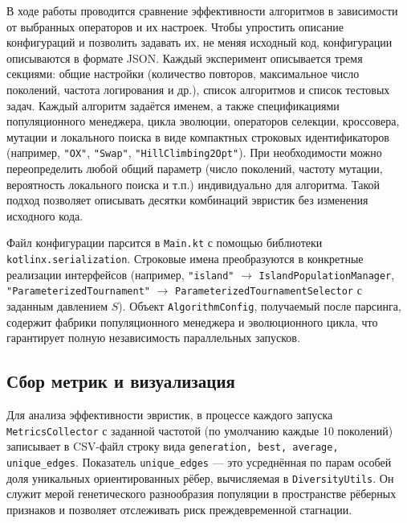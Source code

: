 \documentclass[a4paper,12pt]{article}
\begin{document}
В ходе работы проводится сравнение эффективности алгоритмов в зависимости от выбранных операторов и их настроек. Чтобы упростить описание конфигураций и позволить задавать их, не меняя исходный код, конфигурации описываются в формате JSON. Каждый эксперимент описывается тремя секциями: общие настройки (количество повторов, максимальное число поколений, частота логирования и др.), список алгоритмов и список тестовых задач. Каждый алгоритм задаётся именем, а также спецификациями популяционного менеджера, цикла эволюции, операторов селекции, кроссовера, мутации и локального поиска в виде компактных строковых идентификаторов (например, \texttt{"OX"}, \texttt{"Swap"}, \texttt{"HillClimbing2Opt"}). При необходимости можно переопределить любой общий параметр (число поколений, частоту мутации, вероятность локального поиска и т.п.) индивидуально для алгоритма. Такой подход позволяет описывать десятки комбинаций эвристик без изменения исходного кода.

Файл конфигурации парсится в \texttt{Main.kt} с помощью библиотеки \texttt{kotlinx.serialization}. Строковые имена преобразуются в конкретные реализации интерфейсов (например, \texttt{"island"} $\to$ \texttt{IslandPopulationManager}, \texttt{"ParameterizedTournament"} $\to$ \texttt{Parameterized\-Tournament\-Selector} с заданным давлением $S$). Объект \texttt{AlgorithmConfig}, получаемый после парсинга, содержит фабрики популяционного менеджера и эволюционного цикла, что гарантирует полную независимость параллельных запусков.

\subsection{Сбор метрик и визуализация}

Для анализа эффективности эвристик, в процессе каждого запуска \texttt{MetricsCollector} с заданной частотой (по умолчанию каждые 10 поколений) записывает в CSV-файл строку вида \texttt{generation, best, average, unique\_edges}. Показатель \texttt{unique\_edges} — это усреднённая по парам особей доля уникальных ориентированных рёбер, вычисляемая в \texttt{DiversityUtils}. Он служит мерой генетического разнообразия популяции в пространстве рёберных признаков и позволяет отслеживать риск преждевременной стагнации.
\end{document}
